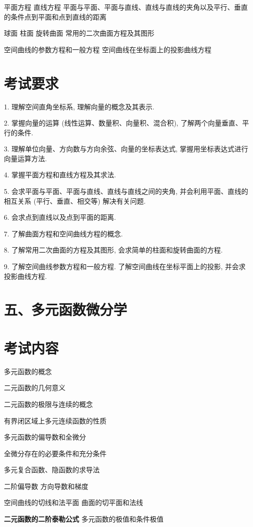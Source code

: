 \documentclass[10pt]{article}
\begin{document}
平面方程 直线方程 平面与平面、平面与直线、直线与直线的夹角以及平行、垂直的条件点到平面和点到直线的距离 

球面 柱面 旋转曲面 常用的二次曲面方程及其图形 

空间曲线的参数方程和一般方程 空间曲线在坐标面上的投影曲线方程

\section*{考试要求}

1. 理解空间直角坐标系, 理解向量的概念及其表示.

2. 掌握向量的运算 (线性运算、数量积、向量积、混合积), 了解两个向量垂直、平行的条件.

3. 理解单位向量、方向数与方向余弦、向量的坐标表达式, 掌握用坐标表达式进行向量运算方法.

4. 掌握平面方程和直线方程及其求法.

5. 会求平面与平面、平面与直线、直线与直线之间的夹角, 并会利用平面、直线的相互关系 (平行、垂直、相交等) 解决有关问题.

6. 会求点到直线以及点到平面的距离.

7. 了解曲面方程和空间曲线方程的概念.

8. 了解常用二次曲面的方程及其图形, 会求简单的柱面和旋转曲面的方程.

9. 了解空间曲线参数方程和一般方程. 了解空间曲线在坐标平面上的投影, 并会求投影曲线方程.

\section*{五、多元函数微分学}

\section*{考试内容}

多元函数的概念 

二元函数的几何意义 

二元函数的极限与连续的概念 

有界闭区域上多元连续函数的性质 

多元函数的偏导数和全微分 

全微分存在的必要条件和充分条件 

多元复合函数、隐函数的求导法 

二阶偏导数 方向导数和梯度 

空间曲线的切线和法平面 曲面的切平面和法线 

\textbf{二元函数的二阶泰勒公式} 多元函数的极值和条件极值 
\end{document}
